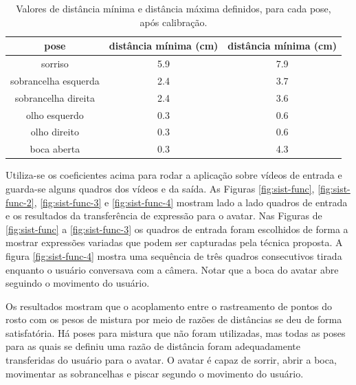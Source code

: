 \begin{table}
\centering
\begin{tabular}{|c|c|c|}
\hline
pose & distância mínima (cm) & distância mínima (cm) \\ \hline
sorriso & 5.9 & 7.9 \\ \hline
sobrancelha esquerda & 2.4 & 3.7 \\ \hline
sobrancelha direita & 2.4 & 3.6 \\ \hline
olho esquerdo & 0.3 & 0.6 \\ \hline
olho direito & 0.3 & 0.6 \\ \hline
boca aberta & 0.3 & 4.3 \\ \hline
\end{tabular}
\caption{Valores de distância mínima e distância máxima definidos, para cada pose, após calibração.}
\label{tab:distance-ratio-coeffs}
\end{table}

Utiliza-se os coeficientes acima para rodar a aplicação sobre vídeos de entrada e guarda-se alguns quadros dos vídeos e da saída.
As Figuras \ref{fig:sist-func}, \ref{fig:sist-func-2}, \ref{fig:sist-func-3} e \ref{fig:sist-func-4} mostram lado a lado quadros de entrada e os resultados da transferência de expressão para o avatar. Nas Figuras de \ref{fig:sist-func} a \ref{fig:sist-func-3} os quadros de entrada foram escolhidos de forma a mostrar expressões variadas que podem ser capturadas pela técnica proposta. A figura \ref{fig:sist-func-4} mostra uma sequência de três quadros consecutivos tirada enquanto o usuário conversava com a câmera. Notar que a boca do avatar abre seguindo o movimento do usuário.

Os resultados mostram que o acoplamento entre o rastreamento de pontos do rosto com os pesos de mistura por meio de razões de distâncias se deu de forma satisfatória. Há poses para mistura que não foram utilizadas, mas todas as poses para as quais se definiu uma razão de distância foram adequadamente transferidas do usuário para o avatar. O avatar é capaz de sorrir, abrir a boca, movimentar as sobrancelhas e piscar segundo o movimento do usuário. 


